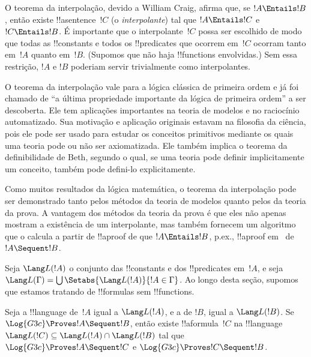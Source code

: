 \documentclass[../../../include/open-logic-section]{subfiles}
\begin{document}


O teorema da interpolação, devido a William Craig, afirma que, se $!A
\Entails !B$, então existe !!a{sentence}~$!C$ (o \emph{interpolante}) tal
que $!A \Entails !C$ e $!C \Entails !B$. É importante que o
interpolante~$!C$ possa ser escolhido de modo que todas as !!{constant}s
e todos os !!{predicate}s que ocorrem em~$!C$ ocorram tanto em~$!A$
quanto em~$!B$. (Supomos que não haja !!{function}s envolvidas.) Sem
essa restrição, $!A$ e $!B$ poderiam servir trivialmente como
interpolantes.

O teorema da interpolação vale para a lógica clássica de primeira ordem
e já foi chamado de ``a última propriedade importante da lógica de
primeira ordem'' a ser descoberta. Ele tem aplicações importantes na
teoria de modelos e no raciocínio automatizado. Sua motivação e aplicação
originais estavam na filosofia da ciência, pois ele pode ser usado para
estudar os conceitos primitivos mediante os quais uma teoria pode ou não
ser axiomatizada. Ele também implica o teorema da definibilidade de Beth,
segundo o qual, se uma teoria pode definir implicitamente um conceito,
também pode defini-lo explicitamente.

Como muitos resultados da lógica matemática, o teorema da interpolação
pode ser demonstrado tanto pelos métodos da teoria de modelos quanto
pelos da teoria da prova. A vantagem dos métodos da teoria da prova é
que eles não apenas mostram a existência de um interpolante, mas também
fornecem um algoritmo que o calcula a partir de !!a{proof} de que $!A
\Entails !B$, p.ex., !!a{proof} em~ de $!A \Sequent !B$.

Seja $\Lang L(!A)$ o conjunto das !!{constant}s e dos !!{predicate}s
em~$!A$, e seja $\Lang L(\Gamma) = \bigcup \Setabs{\Lang L(!A)}{!A \in
\Gamma}$. Ao longo desta seção, supomos que estamos tratando de
!!{formula}s sem !!{function}s.

\begin{thm}
Seja a !!{language} de~$!A$ igual a $\Lang L(!A)$, e a de $!B$, igual a
$\Lang L(!B)$.
Se $\Log{G3c} \Proves !A \Sequent !B$, então existe !!a{formula}~$!C$ na
!!{language}~$\Lang L(!C) \subseteq \Lang L(!A) \cap \Lang L(!B)$ tal
que $\Log{G3c} \Proves !A \Sequent !C$ e $\Log{G3c} \Proves !C
\Sequent !B$.
\end{thm}
\end{document}
